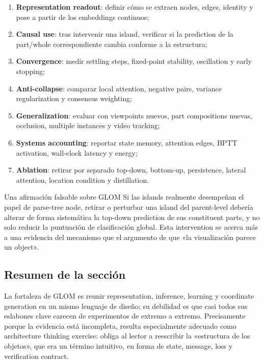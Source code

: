 \documentclass[a4paper]{article}
\begin{document}
\begin{enumerate}
  \item \textbf{Representation readout}: definir cómo se extraen nodes, edges, identity y pose a partir de los embeddings continuos;
  \item \textbf{Causal use}: tras intervenir una island, verificar si la prediction de la part/whole correspondiente cambia conforme a la estructura;
  \item \textbf{Convergence}: medir settling steps, fixed-point stability, oscillation y early stopping;
  \item \textbf{Anti-collapse}: comparar local attention, negative pairs, variance regularization y consensus weighting;
  \item \textbf{Generalization}: evaluar con viewpoints nuevos, part compositions nuevas, occlusion, multiple instances y video tracking;
  \item \textbf{Systems accounting}: reportar state memory, attention edges, BPTT activation, wall-clock latency y energy;
  \item \textbf{Ablation}: retirar por separado top-down, bottom-up, persistence, lateral attention, location condition y distillation.
\end{enumerate}

\begin{importantbox}{Una afirmación falsable sobre GLOM}
Si las islands realmente desempeñan el papel de parse-tree node, retirar o perturbar una island del parent-level debería alterar de forma sistemática la top-down prediction de sus constituent parts, y no solo reducir la puntuación de clasificación global. Esta intervention se acerca más a una evidencia del mecanismo que el argumento de que «la visualización parece un object».
\end{importantbox}

\subsection{Resumen de la sección}

La fortaleza de GLOM es reunir representation, inference, learning y coordinate generation en un mismo lenguaje de diseño; su debilidad es que casi todos sus eslabones clave carecen de experimentos de extremo a extremo. Precisamente porque la evidencia está incompleta, resulta especialmente adecuado como architecture thinking exercise: obliga al lector a reescribir la «estructura de los objetos», que era un término intuitivo, en forma de state, message, loss y verification contract.
\end{document}
